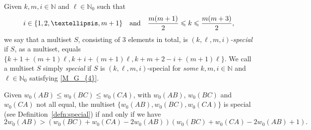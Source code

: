 \documentclass[10pt,a4paper]{amsart}
\begin{document}
{\begin{defn}\label{defn:special}
Given $k, m, i \in \mathbb{N}$ and $\ell \in \mathbb{N}_{0}$ such that
\begin{equation}\label{M_G_{4}}
i \in \{1,2,\ldots,m+1\} \quad \text{and} \quad \frac{m(m+1)}{2} \leqslant k \leqslant \frac{m(m+3)}{2},
\end{equation}
we say that a multiset $S$, consisting of $3$ elements in total, is \emph{$(k,\ell,m,i)$-special} if $S$, as a multiset, equals $\{k+1+(m+1)\ell,k+i+(m+1)\ell,k+m+2-i+(m+1)\ell\}$. We call a multiset $S$ simply \emph{special} if $S$ is $(k,\ell,m,i)$-special for \emph{some} $k, m, i \in \mathbb{N}$ and $\ell \in \mathbb{N}_{0}$ satisfying \eqref{M_G_{4}}.
\end{defn}

\begin{lemma}\label{lem:nec_suff}
Given $w_{0}(AB) \leqslant w_{0}(BC) \leqslant w_{0}(CA)$, with $w_{0}(AB)$, $w_{0}(BC)$ and $w_{0}(CA)$ not all equal, the multiset $\{w_{0}(AB),w_{0}(BC),w_{0}(CA)\}$ is special (see Definition~\ref{defn:special}) if and only if we have
\begin{equation}
2w_{0}(AB)>\left(w_{0}(BC)+w_{0}(CA)-2w_{0}(AB)\right)\left(w_{0}(BC)+w_{0}(CA)-2w_{0}(AB)+1\right).\label{eq:nec_suff}
\end{equation}
\end{lemma}

}
\end{document}
